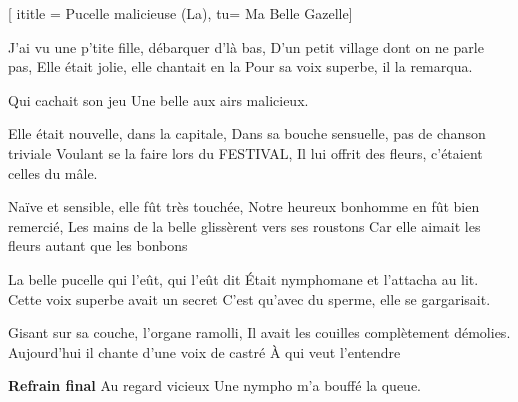  [
ititle = {Pucelle malicieuse (La)},
tu= {Ma Belle Gazelle}]


\beginverse
J'ai vu une p'tite fille, débarquer d'là bas,
D'un petit village dont on ne parle pas,
Elle était jolie, elle chantait en la
Pour sa voix superbe, il la remarqua.
\endverse

\beginchorus
{}
Qui cachait son jeu
Une belle aux airs malicieux.
\endchorus

\beginverse
Elle était nouvelle, dans la capitale,
Dans sa bouche sensuelle, pas de chanson triviale
Voulant se la faire lors du FESTIVAL,
Il lui offrit des fleurs, c'étaient celles du mâle.
\endverse

\beginverse
Naïve et sensible, elle fût très touchée,
Notre heureux bonhomme en fût bien remercié,
Les mains de la belle glissèrent vers ses roustons
Car elle aimait les fleurs autant que les bonbons
\endverse

\beginverse
La belle pucelle qui l'eût, qui l'eût dit
Était nymphomane et l'attacha au lit.
Cette voix superbe avait un secret
C'est qu'avec du sperme, elle se gargarisait.
\endverse

\beginverse
Gisant sur sa couche, l'organe ramolli,
Il avait les couilles complètement démolies.
Aujourd'hui il chante d'une voix de castré
À qui veut l'entendre
\endverse

\beginchorus
\textbf {Refrain final}
Au regard vicieux
Une nympho m'a bouffé la queue.
\endchorus

\endsong